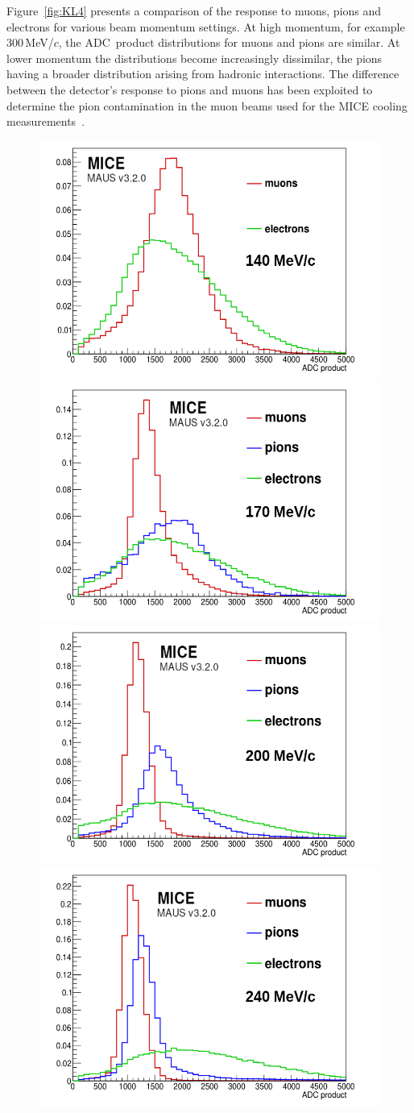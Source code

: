 Figure~\ref{fig:KL4} presents a comparison of the response to muons,
pions and electrons for various beam momentum settings.
At high momentum, for example 300\,MeV/$c$, the ADC~product
distributions for muons and pions are similar.
At lower momentum the distributions become increasingly dissimilar,
the pions having a broader distribution arising from hadronic
interactions.
The difference between the detector's response to pions and muons has
been exploited to determine the pion contamination in the muon beams
used for the MICE cooling measurements~\cite{2016JInst..11P3001A}.  
\begin{figure}
  \begin{center}
    \includegraphics[width=0.45\columnwidth]{./04-KL/Figures/mu_vs_e_140MEV-edited.png}
    \includegraphics[width=0.45\columnwidth]{./04-KL/Figures/mu_vs_pi_vs_e_170MEV-edited.png} 
    \includegraphics[width=0.45\columnwidth]{./04-KL/Figures/mu_vs_pi_vs_e_200MEV-edited.png}
    \includegraphics[width=0.45\columnwidth]{./04-KL/Figures/mu_vs_pi_vs_e_240MEV-edited.png}  	

\end{center}
\end{figure}
